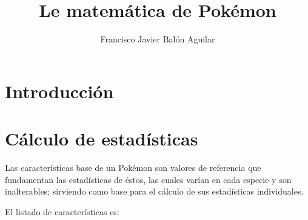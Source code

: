\documentclass[a4paper, 11pt, titlepage]{article}
\title{Le matemática de Pokémon}
\author{Francisco Javier Balón Aguilar}
\begin{document}
\maketitle
\renewcommand{\contentsname}{Índice}
\tableofcontents
\newpage

\section{Introducción}\label{introduccion}

\section{Cálculo de estadísticas}

    Las características base de un Pokémon son valores de referencia que fundamentan 
    las estadísticas de éstos, las cuales varían en cada especie y son inalterables; sirviendo 
    como base para el cálculo de sus estadísticas individuales.

    El listado de características es:
\end{document}
